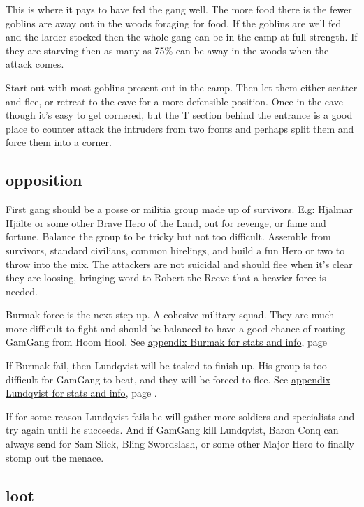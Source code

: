 This is where it pays to have fed the gang well. The more food there is the fewer goblins are away out in the woods foraging for food. If the goblins are well fed and the larder stocked then the whole gang can be in the camp at full strength. If they are starving then as many as 75\% can be away in the woods when the attack comes.

Start out with most goblins present out in the camp. Then let them either scatter and flee, or retreat to the cave for a more defensible position. Once in the cave though it's easy to get cornered, but the T section behind the entrance is a good place to counter attack the intruders from two fronts and perhaps split them and force them into a corner.


\subsection*{opposition}

First gang should be a posse or militia group made up of survivors. E.g: Hjalmar Hjälte or some other Brave Hero of the Land, out for revenge, or fame and fortune. Balance the group to be tricky but not too difficult. Assemble from survivors, standard civilians, common hirelings, and build a fun Hero or two to throw into the mix.
The attackers are not suicidal and should flee when it's clear they are loosing, bringing word to Robert the Reeve that a heavier force is needed.

Burmak force is the next step up. A cohesive military squad. They are much more difficult to fight and should be balanced to have a good chance of routing GamGang from Hoom Hool. See \hyperref[appendixburmak]{appendix Burmak for stats and info}, page \pageref{appendixburmak}

If Burmak fail, then Lundqvist will be tasked to finish up. His group is too difficult for GamGang to beat, and they will be forced to flee. See \hyperref[appendixlundqvist]{appendix Lundqvist for stats and info}, page \pageref{appendixlundqvist}.

If for some reason Lundqvist fails he will gather more soldiers and specialists and try again until he succeeds. And if GamGang kill Lundqvist, Baron Conq can always send for Sam Slick, Bling Swordslash, or some other Major Hero to finally stomp out the menace.


\subsection*{loot}

